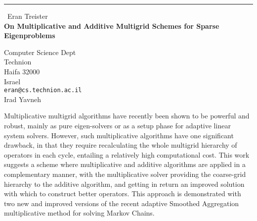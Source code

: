 \documentclass{report}
\begin{document}
\begin{center}
\rule{6in}{1pt} \
{\large Eran Treister \\
{\bf On Multiplicative and Additive Multigrid Schemes for Sparse Eigenproblems}}

Computer Science Dept  \\ Technion \\ Haifa 32000 \\ Israel
\\
{\tt eran@cs.technion.ac.il}\\
Irad Yavneh\end{center}

Multiplicative multigrid algorithms have recently been shown to be
powerful and robust, mainly as pure eigen-solvers or as a setup phase for
adaptive linear system solvers. However, such multiplicative algorithms
have one significant drawback, in that
they require recalculating the whole multigrid hierarchy of operators in
each cycle, entailing a relatively high computational cost. This work
suggests a scheme where multiplicative
and additive algorithms are applied in a complementary manner, with the
multiplicative solver providing the coarse-grid hierarchy to the additive
algorithm, and getting in return an improved solution with which to
construct better operators. This approach is demonstrated with two new
and improved versions of the recent adaptive Smoothed Aggregation
multiplicative method for solving Markov Chains.
\end{document}
